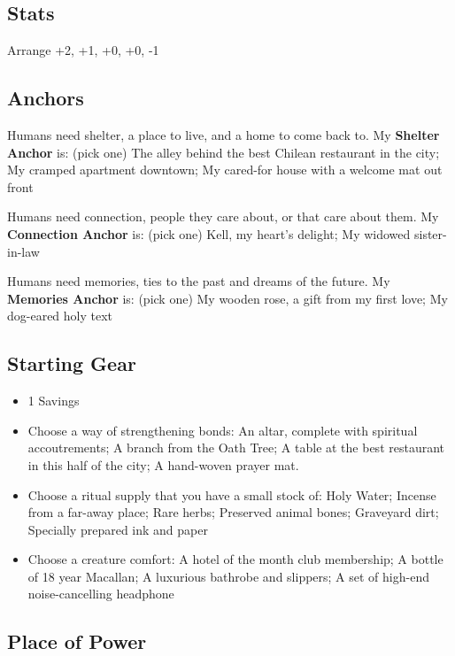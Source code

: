 \documentclass[10pt,twoside,openright]{memoir}
\begin{document}
\hypertarget{stats-5}{%
\subsection{Stats}\label{stats-5}}

Arrange +2, +1, +0, +0, -1

\hypertarget{anchors-4}{%
\subsection{Anchors}\label{anchors-4}}

Humans need shelter, a place to live, and a home to come back to. My
\textbf{Shelter Anchor} is: (pick one) The alley behind the best Chilean
restaurant in the city; My cramped apartment downtown; My cared-for
house with a welcome mat out front

Humans need connection, people they care about, or that care about them.
My \textbf{Connection Anchor} is: (pick one) Kell, my heart's delight;
My widowed sister-in-law

Humans need memories, ties to the past and dreams of the future. My
\textbf{Memories Anchor} is: (pick one) My wooden rose, a gift from my
first love; My dog-eared holy text

\hypertarget{starting-gear-4}{%
\subsection{Starting Gear}\label{starting-gear-4}}

\begin{itemize}
\tightlist
\item
  1 Savings
\item
  Choose a way of strengthening bonds: An altar, complete with spiritual
  accoutrements; A branch from the Oath Tree; A table at the best
  restaurant in this half of the city; A hand-woven prayer mat.
\item
  Choose a ritual supply that you have a small stock of: Holy Water;
  Incense from a far-away place; Rare herbs; Preserved animal bones;
  Graveyard dirt; Specially prepared ink and paper
\item
  Choose a creature comfort: A hotel of the month club membership; A
  bottle of 18 year Macallan; A luxurious bathrobe and slippers; A set
  of high-end noise-cancelling headphone
\end{itemize}

\hypertarget{place-of-power-2}{%
\subsection{Place of Power}\label{place-of-power-2}}
\end{document}
